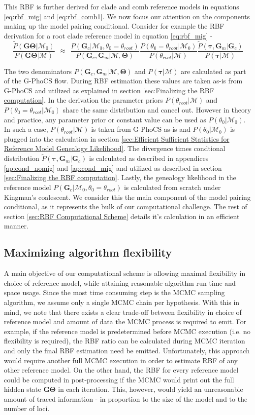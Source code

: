 \documentclass[11pt]{article}
\newcommand{\vect}[1]{\boldsymbol{\mathbf{#1}}}
\newcommand{\M}{\mathcal{M}}
\newcommand{\G}{\vect{G}}
\newcommand{\T}{\vect{\Theta}}
\newcommand{\GT}{\G\T}
\newcommand{\Pref}{\widetilde{P}}
\newcommand{\1}{\mathbbm{1}}
\newcommand{\troot}{\theta_{root}}
\newcommand{\Gc}{\G_c}
\newcommand{\Gm}{\G_m}
\newcommand{\gp}{G-PhoCS }
\newcommand{\taus}{\vect\tau}
\begin{document}
This RBF is further derived for clade and comb reference models in equations  \ref{eq:rbf_mig} and \ref{eq:rbf_comb1}. 
%
We now focus our attention on the components making up the model pairing conditional. Consider for example the RBF derivation for a root clade reference model in equation \ref{eq:rbf_mig} - 
\[ 
	\frac{\Pref(\GT|\M_0) }{P(\GT|\M)}
	~~\approx~~ 
	\frac{ P(\Gc|\M_0,\theta_0=\troot) }{ P(\Gc,\Gm|\M,\T)} 
	\frac{ P(\theta_0=\troot|\M_0)}{P(\troot|\M)}
	\frac{ \Pref(\taus,\Gm|\Gc)}{P(\taus|\M)}
\]

The two denominators $P(\Gc,\Gm|\M,\T)$ and $P(\taus|\M)$ are calculated as part of the \gp flow.
%
During RBF estimation these values are taken as-is from \gp and utilized as explained in section \ref{sec:Finalizing the RBF computation}.
%
%
In the derivation the parameter priors $P(\troot|\M)$ and $P(\theta_0=\troot|\M_0)$ share the same distribution and cancel out.
%
However in theory and practice, any parameter prior or constant value can be used as $P(\theta_0|\M_0)$.
%
In such a case, $P(\troot|\M)$ is taken from \gp as-is and $P(\theta_0|\M_0)$ is plugged into the calculation in section \ref{sec:Efficient Sufficient Statistics for Reference Model Genealogy Likelihood}.
%
%
The divergence times condtional distribution $\Pref(\taus,\Gm|\Gc)$ is calculated as described in appendices \ref{ap:cond_nomig} and \ref{ap:cond_mig} and utilized as described in section \ref{sec:Finalizing the RBF computation}.
%
Lastly, the genealogy likelihood in the reference model $P(\Gc|\M_0,\theta_0=\troot)$ is calculated from scratch under Kingman's coalescent. 
%
We consider this the main component of the model pairing conditional, as it represents the bulk of our computational challenge. The rest of section \ref{sec:RBF Computational Scheme} details it's calculation in an efficient manner.

\subsection{Maximizing algorithm flexibility}

A main objective of our computational scheme is allowing maximal flexibility in choice of reference model, while attaining reasonable algorithm run time and space usage.
%
Since the most time consuming step is the MCMC sampling algorithm, we assume only a single MCMC chain per hypothesis.
%
With this in mind, we note that there exists a clear trade-off between flexibility in choice of reference model and amount of data the MCMC process is required to emit. 
%
For example, if the reference model is predetermined before MCMC execution (i.e. no flexibility is required), the RBF ratio can be calculated during MCMC iteration and only the final RBF estimation need be emitted.
%
Unfortunately, this approach would require another full MCMC execution in order to estimate RBF of any other reference model.
%
On the other hand, the RBF for every reference model could be computed in post-processing if the MCMC would print out the full hidden state $\GT$ in each iteration.
%
This, however, would yield an unreasonable amount of traced information - in proportion to the size of the model and to the number of loci.
\end{document}
